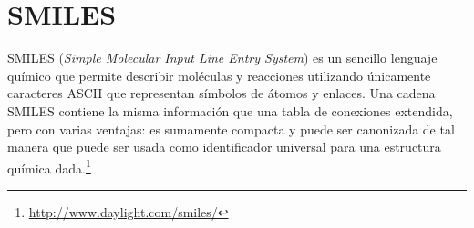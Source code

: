 \section{SMILES}
SMILES (\textit{Simple Molecular Input Line Entry System}) es un
sencillo lenguaje químico que permite describir moléculas y reacciones
utilizando únicamente caracteres ASCII que representan símbolos de
átomos y enlaces. Una cadena SMILES contiene la misma información que
una tabla de conexiones extendida, pero con varias ventajas: es
sumamente compacta y puede ser canonizada de tal manera que puede ser
usada como identificador universal para una estructura química
dada.\footnote{\url{http://www.daylight.com/smiles/}}

